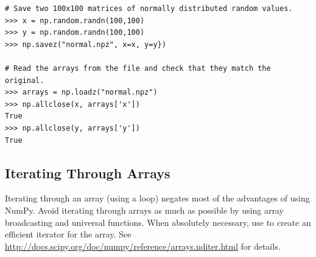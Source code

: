 \begin{lstlisting}
# Save two 100x100 matrices of normally distributed random values.
>>> x = np.random.randn(100,100)
>>> y = np.random.randn(100,100)
>>> np.savez("normal.npz", x=x, y=y})

# Read the arrays from the file and check that they match the original.
>>> arrays = np.loadz("normal.npz")
>>> np.allclose(x, arrays['x'])
True
>>> np.allclose(y, arrays['y'])
True
\end{lstlisting}

\subsection*{Iterating Through Arrays} %

Iterating through an array (using a  loop) negates most of the advantages of using NumPy.
Avoid iterating through arrays as much as possible by using array broadcasting and universal functions.
When absolutely necessary, use  to create an efficient iterator for the array.
See \url{http://docs.scipy.org/doc/numpy/reference/arrays.nditer.html} for details.


